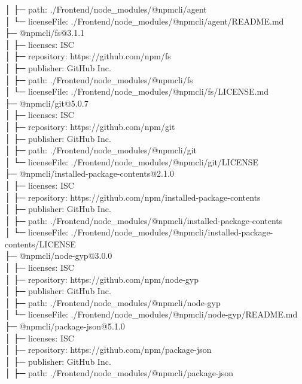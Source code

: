 │  ├─ path: ./Frontend/node\_modules/@npmcli/agent\\
│  └─ licenseFile: ./Frontend/node\_modules/@npmcli/agent/README.md\\
├─ @npmcli/fs@3.1.1\\
│  ├─ licenses: ISC\\
│  ├─ repository: https://github.com/npm/fs\\
│  ├─ publisher: GitHub Inc.\\
│  ├─ path: ./Frontend/node\_modules/@npmcli/fs\\
│  └─ licenseFile: ./Frontend/node\_modules/@npmcli/fs/LICENSE.md\\
├─ @npmcli/git@5.0.7\\
│  ├─ licenses: ISC\\
│  ├─ repository: https://github.com/npm/git\\
│  ├─ publisher: GitHub Inc.\\
│  ├─ path: ./Frontend/node\_modules/@npmcli/git\\
│  └─ licenseFile: ./Frontend/node\_modules/@npmcli/git/LICENSE\\
├─ @npmcli/installed-package-contents@2.1.0\\
│  ├─ licenses: ISC\\
│  ├─ repository: https://github.com/npm/installed-package-contents\\
│  ├─ publisher: GitHub Inc.\\
│  ├─ path: ./Frontend/node\_modules/@npmcli/installed-package-contents\\
│  └─ licenseFile: ./Frontend/node\_modules/@npmcli/installed-package-contents/LICENSE\\
├─ @npmcli/node-gyp@3.0.0\\
│  ├─ licenses: ISC\\
│  ├─ repository: https://github.com/npm/node-gyp\\
│  ├─ publisher: GitHub Inc.\\
│  ├─ path: ./Frontend/node\_modules/@npmcli/node-gyp\\
│  └─ licenseFile: ./Frontend/node\_modules/@npmcli/node-gyp/README.md\\
├─ @npmcli/package-json@5.1.0\\
│  ├─ licenses: ISC\\
│  ├─ repository: https://github.com/npm/package-json\\
│  ├─ publisher: GitHub Inc.\\
│  ├─ path: ./Frontend/node\_modules/@npmcli/package-json\\

